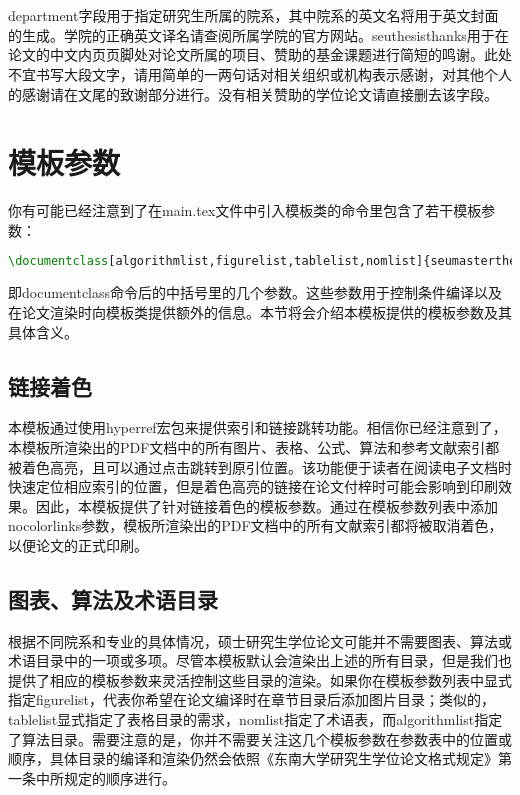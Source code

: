 ~


~

{\codefont department}字段用于指定研究生所属的院系，其中院系的英文名将用于英文封面的生成。学院的正确英文译名请查阅所属学院的官方网站。{\codefont seuthesisthanks}用于在论文的中文内页页脚处对论文所属的项目、赞助的基金课题进行简短的鸣谢。此处不宜书写大段文字，请用简单的一两句话对相关组织或机构表示感谢，对其他个人的感谢请在文尾的致谢部分进行。没有相关赞助的学位论文请直接删去该字段。

\section{模板参数}

你有可能已经注意到了在main.tex文件中引入模板类的命令里包含了若干模板参数：

\begin{tcolorbox}
\begin{lstlisting}[language=TeX]
\documentclass[algorithmlist,figurelist,tablelist,nomlist]{seumasterthesis}
\end{lstlisting}
\end{tcolorbox}

\noindent 即{\codefont documentclass}命令后的中括号里的几个参数。这些参数用于控制条件编译以及在论文渲染时向模板类提供额外的信息。本节将会介绍本模板提供的模板参数及其具体含义。

\subsection{链接着色}

本模板通过使用hyperref宏包来提供索引和链接跳转功能。相信你已经注意到了，本模板所渲染出的PDF文档中的所有图片、表格、公式、算法和参考文献索引都被着色高亮，且可以通过点击跳转到原引位置。该功能便于读者在阅读电子文档时快速定位相应索引的位置，但是着色高亮的链接在论文付梓时可能会影响到印刷效果。因此，本模板提供了针对链接着色的模板参数。通过在模板参数列表中添加{\codefont nocolorlinks}参数，模板所渲染出的PDF文档中的所有文献索引都将被取消着色，以便论文的正式印刷。

\subsection{图表、算法及术语目录}

根据不同院系和专业的具体情况，硕士研究生学位论文可能并不需要图表、算法或术语目录中的一项或多项。尽管本模板默认会渲染出上述的所有目录，但是我们也提供了相应的模板参数来灵活控制这些目录的渲染。如果你在模板参数列表中显式指定{\codefont figurelist}，代表你希望在论文编译时在章节目录后添加图片目录；类似的，{\codefont tablelist}显式指定了表格目录的需求，{\codefont nomlist}指定了术语表，而{\codefont algorithmlist}指定了算法目录。需要注意的是，你并不需要关注这几个模板参数在参数表中的位置或顺序，具体目录的编译和渲染仍然会依照《东南大学研究生学位论文格式规定》\cite{seugs2023rule}第一条中所规定的顺序进行。

